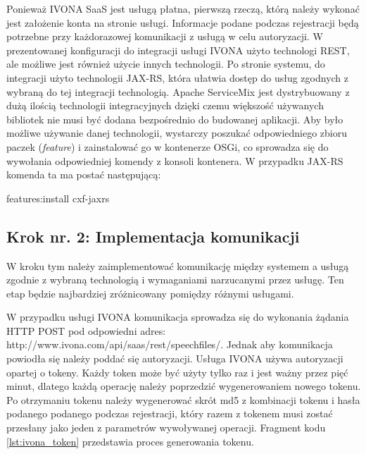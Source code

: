 Ponieważ IVONA SaaS jest usługą płatna, pierwszą rzeczą, którą należy wykonać jest założenie konta na stronie usługi. Informacje podane podczas rejestracji będą potrzebne przy każdorazowej komunikacji z usługą w celu autoryzacji. W prezentowanej konfiguracji do integracji usługi IVONA użyto technologi REST, ale możliwe jest również użycie innych technologii. Po stronie systemu, do integracji użyto technologii JAX-RS, która ułatwia dostęp do usług zgodnych z wybraną do tej integracji technologią. Apache ServiceMix jest dystrybuowany z dużą ilością technologii integracyjnych dzięki czemu większość używanych bibliotek nie musi być dodana bezpośrednio do budowanej aplikacji. Aby było możliwe używanie danej technologii, wystarczy poszukać odpowiedniego zbioru paczek (\textit{feature}) i zainstalować go w kontenerze OSGi, co sprowadza się do wywołania odpowiedniej komendy z konsoli kontenera. W przypadku JAX-RS komenda ta ma postać następującą: 
\begin{center}
features:install cxf-jaxrs
\end{center}

\subsection {Krok nr. 2: Implementacja komunikacji}

W kroku tym należy zaimplementować komunikację między systemem a usługą zgodnie z wybraną technologią i wymaganiami narzucanymi przez usługę. Ten etap będzie najbardziej zróżnicowany pomiędzy różnymi usługami.

W przypadku usługi IVONA komunikacja sprowadza się do wykonania żądania HTTP POST pod odpowiedni adres: http://www.ivona.com/api/saas/rest/speechfiles/. Jednak aby komunikacja powiodła się należy poddać się autoryzacji. Usługa IVONA używa autoryzacji opartej o tokeny. Każdy token może być użyty tylko raz i jest ważny przez pięć minut, dlatego każdą operację należy poprzedzić wygenerowaniem nowego tokenu. Po otrzymaniu tokenu należy wygenerować skrót md5 z kombinacji tokenu i hasła podanego podanego podczas rejestracji, który razem z tokenem musi zostać przesłany jako jeden z parametrów wywoływanej operacji. Fragment kodu \ref{lst:ivona_token} przedstawia proces generowania tokenu.

\lstset{language=Java, tabsize=4, caption=Proces generowania tokenu usługi IVONA,label=lst:ivona_token}

